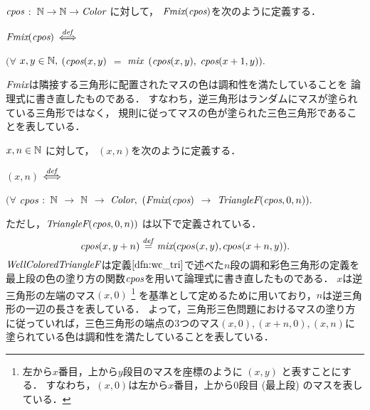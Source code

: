 \begin{dfn}[$\Fmix$]
  $\textit{cpos}$ $:$ $\mathbb{N} \to \mathbb{N} \to \textit{Color}$ に対して，
  $\textit{Fmix}(\textit{cpos})$を次のように定義する．

  
  $\textit{Fmix}(\textit{cpos})$ $\overset{{\it def}}{\Longleftrightarrow}$
  
  $(\forall$ $x,y \in\mathbb{N},$
  $(\textit{cpos}(x,y)$ $=$ $\textit{mix}$ $(\textit{cpos}(x,y),$ $\textit{cpos}(x+1,y)).$

  $\Fmix$は隣接する三角形に配置されたマスの色は調和性を満たしていることを
  論理式に書き直したものである．
  すなわち，逆三角形はランダムにマスが塗られている三角形ではなく，
  規則に従ってマスの色が塗られた三色三角形であることを表している．
\end{dfn}


\begin{dfn}[$\WCTF$]
  $x, n \in \mathbb{N}$ に対して，
  \WCTF$(x, n)$を次のように定義する．
  
  \WCT$(x, n)$ $\overset{{\it def}}{\Longleftrightarrow}$
  
  $(\forall$ $\textit{cpos}$ $:$ $\mathbb{N}$ $\to$ $\mathbb{N}$ $\to$ $\textit{Color},$
  $(\textit{Fmix}(\textit{cpos})$ $\to$ $\textit{TriangleF}(\textit{cpos},0,n)).$

  ただし，$\textit{TriangleF}(\textit{cpos},0,n))$ は以下で定義されている．
  \[
  \textit{cpos}(x,y+n) \overset{{\it def}}{=} \textit{mix}(cpos(x,y),cpos(x+n,y)).
  \]
  $\WCTF$は定義$\ref{dfn:wc_tri}$で述べた$n$段の調和彩色三角形の定義を最上段の色の塗り方の関数$\textit{cpos}$を用いて論理式に書き直したものである．
  $x$は逆三角形の左端のマス$(x,0)$
  \footnote
      {
        左から$x$番目，上から$y$段目のマスを座標のように $(x,y)$ と表すことにする．
        すなわち，$(x,0)$は左から$x$番目，上から$0$段目 (最上段) のマスを表している．
      }
  を基準として定めるために用いており，$n$は逆三角形の一辺の長さを表している．
  よって，三角形三色問題におけるマスの塗り方に従っていれば，三色三角形の端点の$3$つのマス$(x,0), (x+n,0), (x,n)$に塗られている色は調和性を満たしていることを表している．
\end{dfn}

